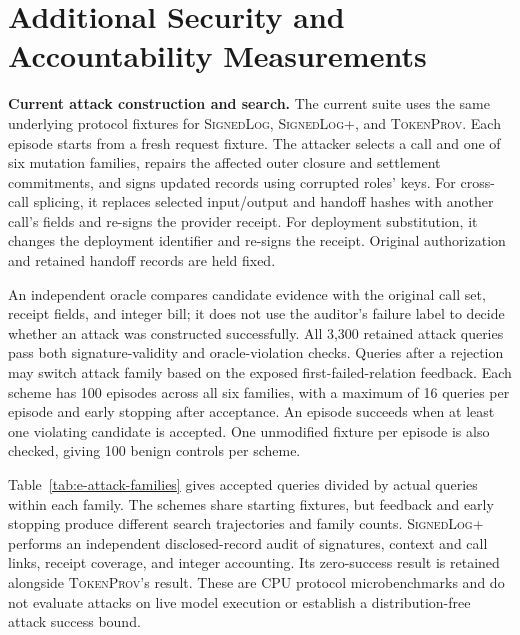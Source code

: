 \section{Additional Security and Accountability Measurements}
\label{app:e-security-accountability}

\noindent\textbf{Current attack construction and search.}
The current suite uses the same underlying protocol fixtures for
\textsc{SignedLog}, \textsc{SignedLog+}, and \textsc{TokenProv}.
Each episode starts from a fresh request fixture.
The attacker selects a call and one of six mutation families, repairs the
affected outer closure and settlement commitments, and signs updated records
using corrupted roles' keys.
For cross-call splicing, it replaces selected input/output and handoff hashes
with another call's fields and re-signs the provider receipt.
For deployment substitution, it changes the deployment identifier and re-signs
the receipt.
Original authorization and retained handoff records are held fixed.

An independent oracle compares candidate evidence with the original call set,
receipt fields, and integer bill; it does not use the auditor's failure label
to decide whether an attack was constructed successfully.
All 3,300 retained attack queries pass both signature-validity and
oracle-violation checks.
Queries after a rejection may switch attack family based on the exposed
first-failed-relation feedback.
Each scheme has 100 episodes across all six families, with a maximum of 16
queries per episode and early stopping after acceptance.
An episode succeeds when at least one violating candidate is accepted.
One unmodified fixture per episode is also checked, giving 100 benign controls
per scheme.

Table~\ref{tab:e-attack-families} gives accepted queries divided by actual
queries within each family.
The schemes share starting fixtures, but feedback and early stopping produce
different search trajectories and family counts.
\textsc{SignedLog+} performs an independent disclosed-record audit of signatures,
context and call links, receipt coverage, and integer accounting.
Its zero-success result is retained alongside \textsc{TokenProv}'s result.
These are CPU protocol microbenchmarks and do not evaluate attacks on live
model execution or establish a distribution-free attack success bound.

